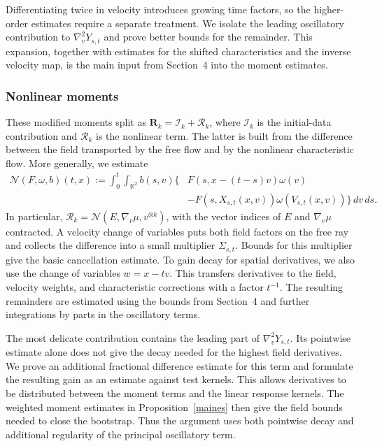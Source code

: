 \documentclass[reqno,11pt]{amsart}
\numberwithin{equation}{section}
\def\R{{\mathbb R}}
\def\R{{\bf R}}
\def\R{\mathbb{R}}
\begin{document}
Differentiating twice in velocity introduces growing time factors,
so the higher-order estimates require a separate treatment.
We isolate the leading oscillatory contribution to
$\nabla_v^2Y_{s,t}$ and prove better bounds for the remainder.
This expansion, together with estimates for the shifted
characteristics and the inverse velocity map, is the main input
from Section~4 into the moment estimates.

\subsubsection{Nonlinear moments}
These modified moments split as $\mathbf R_k=\mathcal I_k+\mathcal R_k$,
where $\mathcal I_k$ is the initial-data contribution and
$\mathcal R_k$ is the nonlinear term.
The latter is built from the difference between the field transported
by the free flow and by the nonlinear characteristic flow. More
generally, we estimate
\begin{equation}\label{defN-unified}
	\begin{split}
		\mathcal N(F,\omega,b)(t,x)
		:=\int_0^t\!\!\int_{\R^2}b(s,v)\big\{
		&F(s,x-(t-s)v)\omega(v)\\
		&-F(s,X_{s,t}(x,v))\omega(V_{s,t}(x,v))
		\big\}\,dv\,ds.
	\end{split}
\end{equation}
In particular, $\mathcal R_k=\mathcal N(E,\nabla_v\mu,v^{\otimes k})$,
with the vector indices of $E$ and $\nabla_v\mu$ contracted.
A velocity change of variables puts both field factors on the free
ray and collects the difference into a small multiplier
$\Sigma_{s,t}$. Bounds for this multiplier give the basic
cancellation estimate. To gain decay for spatial derivatives,
we also use the change of variables $w=x-tv$. This transfers
derivatives to the field, velocity weights, and characteristic
corrections with a factor $t^{-1}$. The resulting remainders are
estimated using the bounds from Section~4 and further integrations
by parts in the oscillatory terms.

The most delicate contribution contains the leading part of
$\nabla_v^2Y_{s,t}$. Its pointwise estimate alone does not give the
decay needed for the highest field derivatives. We prove an
additional fractional difference estimate for this term and
formulate the resulting gain as an estimate against test kernels.
This allows derivatives to be distributed between the moment terms
and the linear response kernels. The weighted moment estimates in
Proposition~\ref{maines} then give the field bounds needed to close
the bootstrap. Thus the argument uses both pointwise decay and
additional regularity of the principal oscillatory term.
\end{document}
